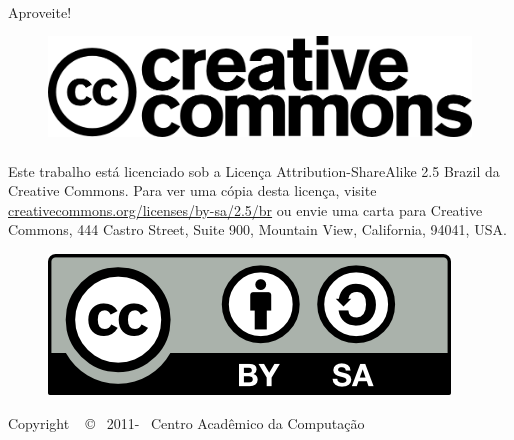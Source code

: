 \documentclass[a4paper,10pt, twocolumn, twoside, titlepage]{article}
\begin{document}
\paragraph{}
Aproveite!

\vfill %

\begin{figure}[H]
    \centering
    \includegraphics[scale=0.70,keepaspectratio=true]{img/cc_logo.png}
\end{figure}

\paragraph{}
Este trabalho está licenciado sob a Licença Attribution-ShareAlike 2.5 Brazil
da Creative Commons. Para ver uma cópia desta licença,
visite \url{creativecommons.org/licenses/by-sa/2.5/br} ou envie uma
carta para Creative Commons, 444 Castro Street, Suite 900, Mountain View,
California, 94041, USA.

\begin{figure}[H]
    \centering
    \includegraphics[scale=0.50,keepaspectratio=true]{img/by-sa.png}
\end{figure}

\begin{center}
    Copyright ~ \copyright ~ 2011-\the\year ~ Centro Acadêmico da Computação
\end{center}

\clearpage

\tableofcontents
\newpage

\onecolumn



\clearpage
\end{document}

